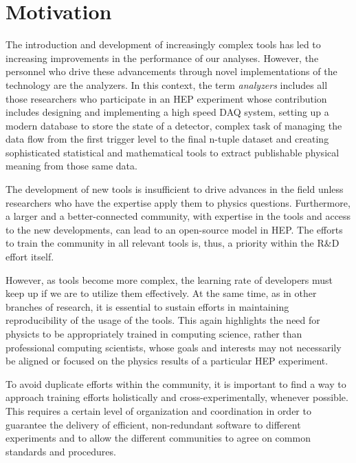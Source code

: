 \section{Motivation}


The introduction and development of increasingly complex tools has led to increasing improvements in the performance of our analyses. However, the personnel who drive these advancements through novel implementations of the technology are the analyzers. In this context, the term {\it analyzers} includes all those researchers who participate in an HEP experiment whose contribution includes designing and implementing a high speed DAQ system, setting up a modern database to store the state of a detector, complex task of managing the data flow from the first trigger level to the final n-tuple dataset and creating sophisticated statistical and mathematical tools to extract publishable physical meaning from those same data.

The development of new tools is insufficient to drive advances in the field unless researchers who have the expertise apply them to physics questions. Furthermore, a larger and a better-connected community, with expertise in the tools and access to the new developments, can lead to an open-source model in HEP. The efforts to train the community in all relevant tools is, thus, a priority within the R\&D effort itself.

However, as tools become more complex, the learning rate of developers must keep up if we are to utilize them effectively.  At the same time, as in other branches of research, it is essential to sustain efforts in maintaining reproducibility of the usage of the tools. This again highlights the need for physicts to be appropriately trained in computing science, rather than professional computing scientists, whose goals and interests may not necessarily be aligned or focused on the physics results of a particular HEP experiment.

To avoid duplicate efforts within the community, it is important to find a way to approach training efforts holistically and cross-experimentally, whenever possible. This requires a certain level of organization and coordination in order to guarantee the delivery of efficient, non-redundant software to different experiments and to allow the different communities to agree on common standards and procedures.

